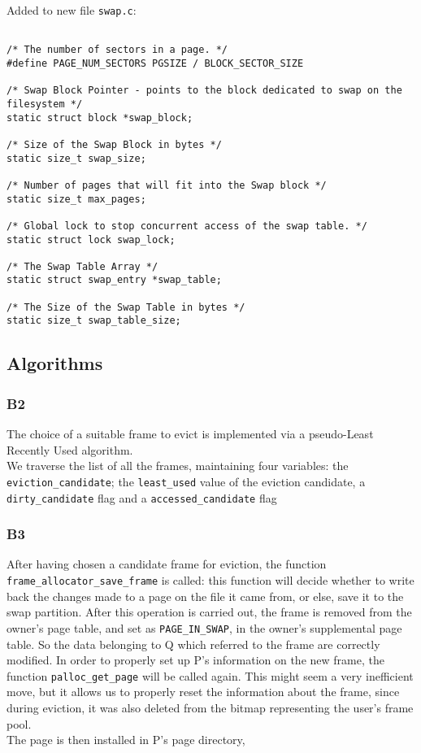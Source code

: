 \documentclass[a4wide, 11pt]{article}
\newcommand{\tx}{\texttt}
\begin{document}
Added to new file \tx{swap.c}:
\begin{verbatim}

/* The number of sectors in a page. */
#define PAGE_NUM_SECTORS PGSIZE / BLOCK_SECTOR_SIZE 

/* Swap Block Pointer - points to the block dedicated to swap on the filesystem */
static struct block *swap_block; 

/* Size of the Swap Block in bytes */
static size_t swap_size;

/* Number of pages that will fit into the Swap block */
static size_t max_pages;         

/* Global lock to stop concurrent access of the swap table. */
static struct lock swap_lock;        

/* The Swap Table Array */
static struct swap_entry *swap_table;

/* The Size of the Swap Table in bytes */
static size_t swap_table_size;
\end{verbatim}


\subsection{Algorithms}
\subsubsection{B2}
The choice of a suitable frame to evict is implemented via a pseudo-Least Recently Used algorithm.\\

We traverse the list of all the frames, maintaining four variables: the \tx{eviction\_candidate}; the \tx{least\_used} value of the eviction candidate, a \tx{dirty\_candidate} flag and a \tx{accessed\_candidate} flag
 
 

\subsubsection{B3}
After having chosen a candidate frame for eviction, the function \tx{frame\_allocator\_save\_frame} is called: this function will decide whether to write back the changes made to a page on the file it came from, or else, save it to the swap partition. After this operation is carried out, the frame is removed from the owner's page table, and set as \tx{PAGE\_IN\_SWAP}, in the owner's supplemental page table. So the data belonging to Q which referred to the frame are correctly modified.
In order to properly set up P's information on the new frame, the function \tx{palloc\_get\_page} will be called again. This might seem a very inefficient move, but it allows us to properly reset the information about the frame, since during eviction, it was also deleted from the bitmap representing the user's frame pool.\\
The page is then installed in P's page directory,   
\end{document}
